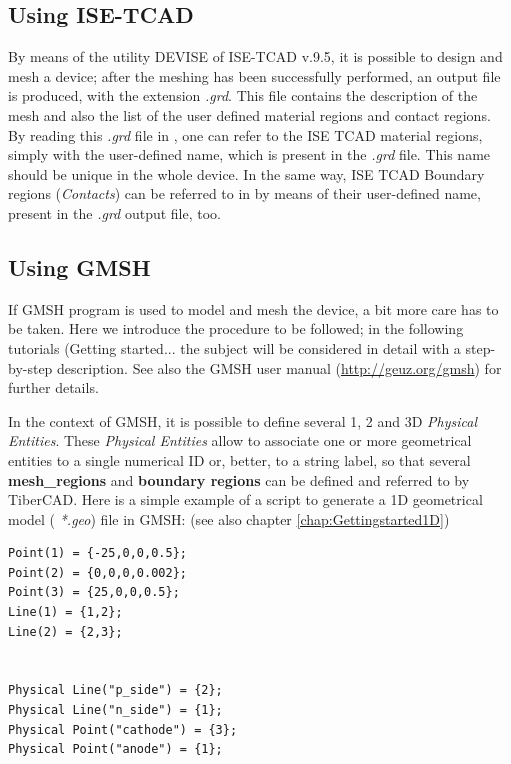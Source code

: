 \subsection{Using ISE-TCAD }

By  means  of  the  utility DEVISE    of  ISE-TCAD  v.9.5,  it  is  possible  to  design and  mesh  a  device;  after the  meshing  has  been    successfully performed,  an  output  file is  produced,   with  the  extension  \textit{.grd}.
This  file  contains    the  description of  the  mesh and  also  the  list  of  the  user defined  material  regions    and  contact  regions.
By  reading  this  \textit{.grd} file  in  \TiberCAD{},  one  can  refer  to  the  ISE TCAD material  regions,  simply  with  the  user-defined name,  which is  present  in  the    \textit{.grd}  file.  This  name  should  be  unique in  the  whole  device.
In the  same way,  ISE TCAD Boundary regions (\textit{Contacts})  can  be  referred to in   \TiberCAD{}  by  means  of  their  user-defined name, present in  the   \textit{.grd} output  file,  too.

\subsection{Using GMSH }

If  GMSH  program  is  used  to  model and  mesh  the  device,  a  bit  more  care  has  to  be  taken. 
Here  we   introduce  the  procedure  to  be  followed; in  the  following tutorials  (Getting  started...  the  subject  will  be  considered  in detail  with  a  step-by-step  description.  
See also the GMSH user manual (\url{http://geuz.org/gmsh}) for  further  details. 

In  the  context of  GMSH,  it  is  possible to  define  several 1,  2  and  3D \textit{Physical Entities}.
These \textit{Physical Entities} allow  to  associate one or more  geometrical  entities to  a  single  numerical  ID
or, better, to  a string label,
so  that  several  
\textbf{mesh\_regions}  and  \textbf{boundary regions} can  be  defined and  referred  to  by  TiberCAD{}.  
Here is  a  simple example  of   a  script  to  generate a  1D geometrical  model ( \textit{*.geo})  file in  GMSH: (see also  chapter \ref{chap:Gettingstarted1D})

\begin{verbatim}
Point(1) = {-25,0,0,0.5};
Point(2) = {0,0,0,0.002};
Point(3) = {25,0,0,0.5};
Line(1) = {1,2};
Line(2) = {2,3};


Physical Line("p_side") = {2};
Physical Line("n_side") = {1};
Physical Point("cathode") = {3};
Physical Point("anode") = {1};
\end{verbatim}

